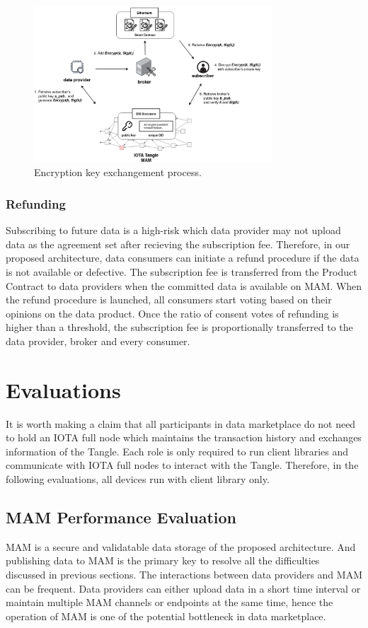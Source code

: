 \documentclass[conference]{IEEEtran}
\begin{document}
\begin{figure}[!t]
    \centering
    \includegraphics[width=3.5in]{key_exchange}
    \caption{Encryption key exchangement process.}
    \label{fig:key_exchange}
\end{figure}

\subsubsection{Refunding}
Subscribing to future data is a high-risk which data provider may not upload data as the agreement set after recieving the subscription fee. Therefore, in our proposed architecture, data consumers can initiate a refund procedure if the data is not available or defective. The subscription fee is transferred from the Product Contract to data providers when the committed data is available on MAM. When the refund procedure is launched, all consumers start voting based on their opinions on the data product. Once the ratio of consent votes of refunding is higher than a threshold, the subscription fee is proportionally transferred to the data provider, broker and every consumer. 


\section{Evaluations}
It is worth making a claim that all participants in data marketplace do not need to hold an IOTA full node which maintains the transaction history and exchanges information of the Tangle. Each role is only required to run client libraries and communicate with IOTA full nodes to interact with the Tangle. Therefore, in the following evaluations, all devices run with client library only.

\subsection{MAM Performance Evaluation}
MAM is a secure and validatable data storage of the proposed architecture. And publishing data to MAM is the primary key to resolve all the difficulties discussed in previous sections. The interactions between data providers and MAM can be frequent. Data providers can either upload data in a short time interval or maintain multiple MAM channels or endpoints at the same time, hence the operation of MAM is one of the potential bottleneck in data marketplace.
\end{document}
